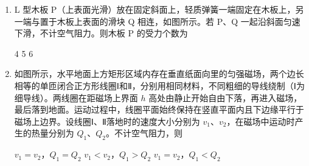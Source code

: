 \documentclass[\gkver]{gaokaozhenti}
\begin{document}
\begin{enumerate}

{保持 $R_{1}$ 不变，缓慢增大 $R_{2}$ 时，$F$ 将变小}
{保持 $R_{2}$ 不变，缓慢增大 $R_{1}$ 时，$F$ 将变大}
{保持 $R_{2}$ 不变，缓慢增大 $R_{1}$ 时，$F$ 将变小}


\item
L 型木板 P（上表面光滑）放在固定斜面上，轻质弹簧一端固定在木板上，另一端与置于木板上表面的滑块 Q 相连，如图所示。若 P、Q 一起沿斜面匀速下滑，不计空气阻力。则木板 P 的受力个数为


{4}
{5}
{6}


\item
如图所示，水平地面上方矩形区域内存在垂直纸面向里的匀强磁场，两个边长相等的单匝闭合正方形线圈Ⅰ和Ⅱ，分别用相同材料，不同粗细的导线绕制（Ⅰ为细导线）。两线圈在距磁场上界面 $h$ 高处由静止开始自由下落，再进入磁场，最后落到地面。运动过程中，线圈平面始终保持在竖直平面内且下边缘平行于磁场上边界。设线圈Ⅰ、Ⅱ落地时的速度大小分别为 $v_{1}$、$v_{2}$，在磁场中运动时产生的热量分别为 $Q_{1}$、$Q_{2}$。不计空气阻力，则


{$v_{1}=v_{2}$，$Q_{1}=Q_{2}$}
{$v_{1}<v_{2}$，$Q_{1}>Q_{2}$}
{$v_{1}=v_{2}$，$Q_{1}<Q_{2}$}


\end{enumerate}
\end{document}
